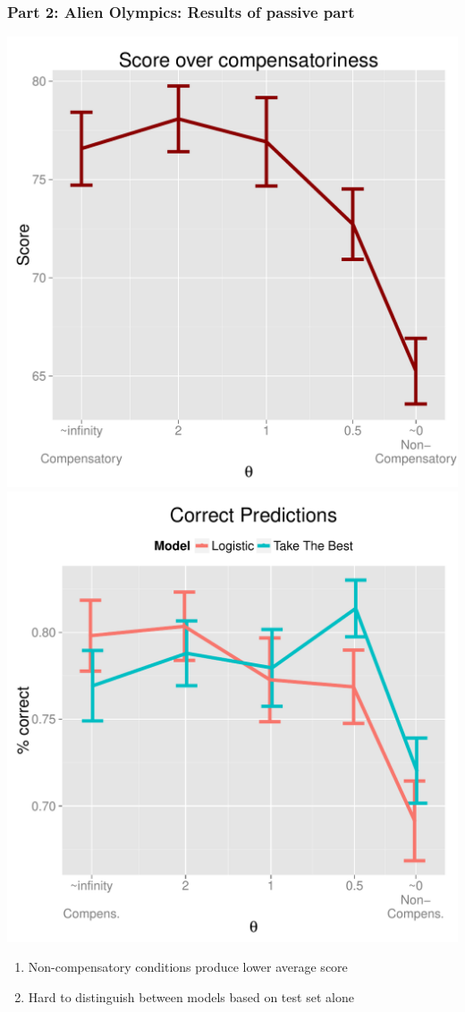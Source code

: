 \documentclass{beamer}
\begin{document}
\begin{frame}
    \frametitle{Part 2: Alien Olympics:  Results of passive part}
 \includegraphics[scale=0.25]{score.pdf}\hspace{1cm}
 \includegraphics[scale=0.25]{percentage.pdf}
\begin{enumerate}
\item Non-compensatory conditions produce lower average score
\item Hard to distinguish between models based on test set alone
\end{enumerate}
\end{frame}
\end{document}
